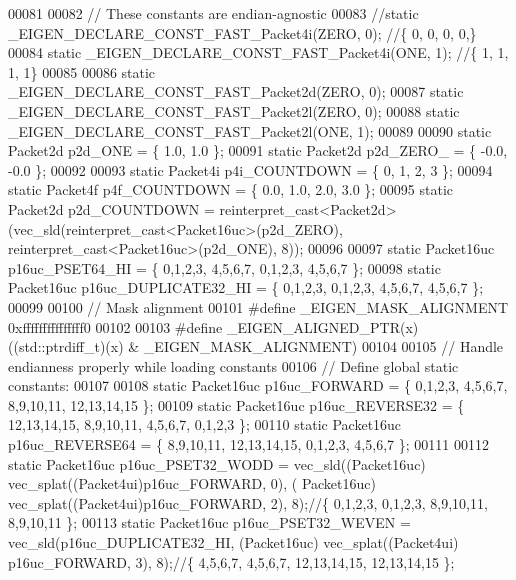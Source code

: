 \begin{DoxyCode}
00081 
00082 \textcolor{comment}{// These constants are endian-agnostic}
00083 \textcolor{comment}{//static \_EIGEN\_DECLARE\_CONST\_FAST\_Packet4i(ZERO, 0); //\{ 0, 0, 0, 0,\}}
00084 \textcolor{keyword}{static} \_EIGEN\_DECLARE\_CONST\_FAST\_Packet4i(ONE, 1); \textcolor{comment}{//\{ 1, 1, 1, 1\}}
00085 
00086 \textcolor{keyword}{static} \_EIGEN\_DECLARE\_CONST\_FAST\_Packet2d(ZERO, 0);
00087 \textcolor{keyword}{static} \_EIGEN\_DECLARE\_CONST\_FAST\_Packet2l(ZERO, 0);
00088 \textcolor{keyword}{static} \_EIGEN\_DECLARE\_CONST\_FAST\_Packet2l(ONE, 1);
00089 
00090 \textcolor{keyword}{static} Packet2d p2d\_ONE = \{ 1.0, 1.0 \}; 
00091 \textcolor{keyword}{static} Packet2d p2d\_ZERO\_ = \{ -0.0, -0.0 \};
00092 
00093 \textcolor{keyword}{static} Packet4i p4i\_COUNTDOWN = \{ 0, 1, 2, 3 \};
00094 \textcolor{keyword}{static} Packet4f p4f\_COUNTDOWN = \{ 0.0, 1.0, 2.0, 3.0 \};
00095 \textcolor{keyword}{static} Packet2d p2d\_COUNTDOWN = \textcolor{keyword}{reinterpret\_cast<}Packet2d\textcolor{keyword}{>}(vec\_sld(reinterpret\_cast<Packet16uc>(p2d\_ZERO), 
      reinterpret\_cast<Packet16uc>(p2d\_ONE), 8));
00096 
00097 \textcolor{keyword}{static} Packet16uc p16uc\_PSET64\_HI = \{ 0,1,2,3, 4,5,6,7, 0,1,2,3, 4,5,6,7 \};
00098 \textcolor{keyword}{static} Packet16uc p16uc\_DUPLICATE32\_HI = \{ 0,1,2,3, 0,1,2,3, 4,5,6,7, 4,5,6,7 \};
00099 
00100 \textcolor{comment}{// Mask alignment}
00101 \textcolor{preprocessor}{#define \_EIGEN\_MASK\_ALIGNMENT   0xfffffffffffffff0}
00102 
00103 \textcolor{preprocessor}{#define \_EIGEN\_ALIGNED\_PTR(x)   ((std::ptrdiff\_t)(x) & \_EIGEN\_MASK\_ALIGNMENT)}
00104 
00105 \textcolor{comment}{// Handle endianness properly while loading constants}
00106 \textcolor{comment}{// Define global static constants:}
00107 
00108 \textcolor{keyword}{static} Packet16uc p16uc\_FORWARD =   \{ 0,1,2,3, 4,5,6,7, 8,9,10,11, 12,13,14,15 \};
00109 \textcolor{keyword}{static} Packet16uc p16uc\_REVERSE32 = \{ 12,13,14,15, 8,9,10,11, 4,5,6,7, 0,1,2,3 \};
00110 \textcolor{keyword}{static} Packet16uc p16uc\_REVERSE64 = \{ 8,9,10,11, 12,13,14,15, 0,1,2,3, 4,5,6,7 \};
00111 
00112 \textcolor{keyword}{static} Packet16uc p16uc\_PSET32\_WODD   = vec\_sld((Packet16uc) vec\_splat((Packet4ui)p16uc\_FORWARD, 0), (
      Packet16uc) vec\_splat((Packet4ui)p16uc\_FORWARD, 2), 8);\textcolor{comment}{//\{ 0,1,2,3, 0,1,2,3, 8,9,10,11, 8,9,10,11 \};}
00113 \textcolor{keyword}{static} Packet16uc p16uc\_PSET32\_WEVEN  = vec\_sld(p16uc\_DUPLICATE32\_HI, (Packet16uc) vec\_splat((Packet4ui)
      p16uc\_FORWARD, 3), 8);\textcolor{comment}{//\{ 4,5,6,7, 4,5,6,7, 12,13,14,15, 12,13,14,15 \};}

\end{DoxyCode}
